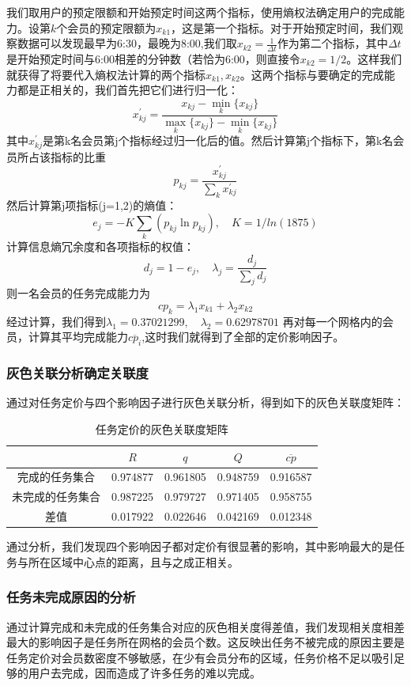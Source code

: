 \documentclass[withoutpreface,bwprint]{cumcmthesis} %
\begin{document}
我们取用户的预定限额和开始预定时间这两个指标，使用熵权法确定用户的完成能力。设第$k$个会员的预定限额为$x_{k1}$，这是第一个指标。对于开始预定时间，我们观察数据可以发现最早为6:30，最晚为8:00,我们取$x_{k2}=\frac{1}{\Delta t}$作为第二个指标，其中$\Delta t$是开始预定时间与6:00相差的分钟数（若恰为6:00，则直接令$x_{k2}=1/2$。这样我们就获得了将要代入熵权法计算的两个指标$x_{k1},x_{k2}$。这两个指标与要确定的完成能力都是正相关的，我们首先把它们进行归一化：
$$x_{kj}^\prime=\frac{x_{kj}-\min_{k} \{x_{kj}\}}{\max_{k} \{x_{kj}\} - \min_{k} \{x_{kj}\}}$$
其中$x_{kj}^\prime$是第k名会员第j个指标经过归一化后的值。然后计算第j个指标下，第k名会员所占该指标的比重
$$p_{kj}=\frac{x_{kj}^\prime}{\sum_{k} x_{kj}^\prime}$$
然后计算第j项指标(j=1,2)的熵值：
$$e_j=-K\sum_{k} (p_{kj}\ln p_{kj}),\quad K=1/ln(1875)$$
计算信息熵冗余度和各项指标的权值：
$$d_j=1-e_j,\quad \lambda_j=\frac{d_j}{\sum_j d_j}$$
则一名会员的任务完成能力为
$$cp_k=\lambda_1x_{k1}+\lambda_2x_{k2}$$
经过计算，我们得到$\lambda_1=0.37021299,\quad \lambda_2=0.62978701$
再对每一个网格内的会员，计算其平均完成能力$\overline{cp_i}$,这时我们就得到了全部的定价影响因子。

\subsubsection{灰色关联分析确定关联度}

通过对任务定价与四个影响因子进行灰色关联分析，得到如下的灰色关联度矩阵：
\begin{table}[H]
    \centering
    \caption{任务定价的灰色关联度矩阵}
    \label{tab:表}
    \begin{tabular}{|c|c|c|c|c|}
        \hline
                         & $R$      & $q$      & $Q$      & $\overline{cp}$ \\ \hline
        完成的任务集合   & 0.974877 & 0.961805 & 0.948759 & 0.916587        \\ \hline
        未完成的任务集合 & 0.987225 & 0.979727 & 0.971405 & 0.958755        \\ \hline
        差值             & 0.017922 & 0.022646 & 0.042169 & 0.012348        \\ \hline
    \end{tabular}
\end{table}
通过分析，我们发现四个影响因子都对定价有很显著的影响，其中影响最大的是任务与所在区域中心点的距离，且与之成正相关。

\subsubsection{任务未完成原因的分析}
通过计算完成和未完成的任务集合对应的灰色相关度得差值，我们发现相关度相差最大的影响因子是任务所在网格的会员个数。这反映出任务不被完成的原因主要是任务定价对会员数密度不够敏感，在少有会员分布的区域，任务价格不足以吸引足够的用户去完成，因而造成了许多任务的难以完成。
\end{document}
